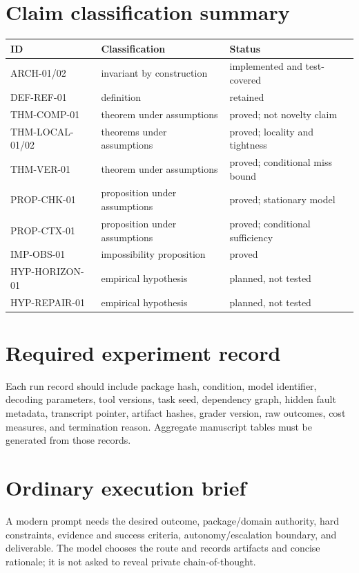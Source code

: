 \documentclass[11pt]{article}
\begin{document}
\section{Claim classification summary}
\begin{longtable}{p{}p{}p{}}
\toprule
ID & Classification & Status\\\midrule
ARCH-01/02 & invariant by construction & implemented and test-covered\\
DEF-REF-01 & definition & retained\\
THM-COMP-01 & theorem under assumptions & proved; not novelty claim\\
THM-LOCAL-01/02 & theorems under assumptions & proved; locality and tightness\\
THM-VER-01 & theorem under assumptions & proved; conditional miss bound\\
PROP-CHK-01 & proposition under assumptions & proved; stationary model\\
PROP-CTX-01 & proposition under assumptions & proved; conditional sufficiency\\
IMP-OBS-01 & impossibility proposition & proved\\
HYP-HORIZON-01 & empirical hypothesis & planned, not tested\\
HYP-REPAIR-01 & empirical hypothesis & planned, not tested\\
\bottomrule
\end{longtable}

\section{Required experiment record}
Each run record should include package hash, condition, model identifier, decoding parameters, tool versions, task seed, dependency graph, hidden fault metadata, transcript pointer, artifact hashes, grader version, raw outcomes, cost measures, and termination reason. Aggregate manuscript tables must be generated from those records.

\section{Ordinary execution brief}
A modern prompt needs the desired outcome, package/domain authority, hard constraints, evidence and success criteria, autonomy/escalation boundary, and deliverable. The model chooses the route and records artifacts and concise rationale; it is not asked to reveal private chain-of-thought.



\end{document}
